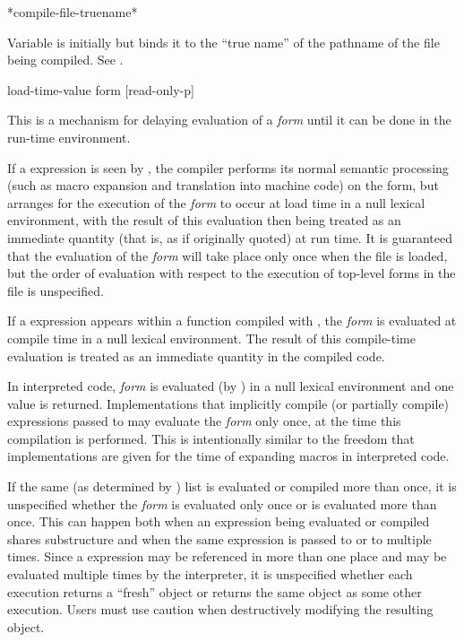 \begin{defun}[Variable]
*compile-file-truename*

Variable is initially  but  binds it to the ``true
name'' of the pathname of the file being compiled.  See .
\end{defun}

\begin{defspec}
  load-time-value form [read-only-p]

  This is a mechanism for delaying evaluation of a \emph{form} until it can be
  done in the run-time environment.

  If a  expression is seen by , the compiler
  performs its normal semantic processing (such as macro expansion and
  translation into machine code) on the form, but arranges for the
  execution of the \emph{form} to occur at load time in a null
  lexical environment, with the result of this evaluation then being
  treated as an immediate quantity (that is, as if originally quoted)
  at run time.  It is guaranteed that 
  the evaluation of the \emph{form} will take place only once when the file is 
  loaded, but the order of evaluation with respect to the execution
  of top-level forms in the file is unspecified.

  If a  expression appears within a function compiled
  with , the \emph{form} is evaluated at compile time in a null lexical
  environment.  The result of this compile-time evaluation is treated as 
  an immediate quantity in the compiled code.  

  In interpreted code, \emph{form} is evaluated (by ) in a null
  lexical environment and one value is returned.  Implementations that
  implicitly compile (or partially compile) expressions passed to
   may evaluate the \emph{form} only once, at the time this
  compilation is performed.  This is intentionally similar to the
  freedom that implementations are given for the time of expanding
  macros in interpreted code.

  If the same (as determined by ) list  is
  evaluated or compiled more than once, it is unspecified whether the \emph{form}
  is evaluated only once or is evaluated more than once.  This can
  happen both when an expression being evaluated or compiled shares
  substructure and when the same expression is passed to  or to
   multiple times.  Since a  expression may be
  referenced in more than one place and may be evaluated multiple times
  by the interpreter, it is unspecified whether each execution returns
  a ``fresh'' object or returns the same object as some other execution.
  Users must use caution when destructively modifying the resulting
  object.


\end{defspec}
